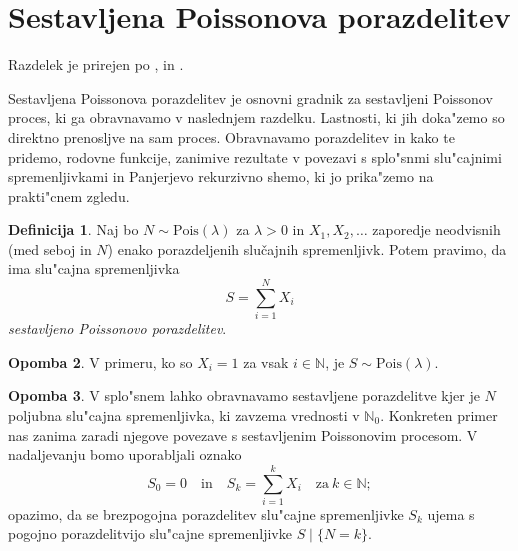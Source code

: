 \documentclass[12pt, a4paper, reqno]{amsart}
\theoremstyle{definition}
\newtheorem{definicija}{Definicija}[section]
\newtheorem{opomba}[definicija]{Opomba}
\theoremstyle{plain}
\newcommand{\N}{\mathbb{N}}
\newcommand{\1}{\mathds{1}}
\newcommand{\Pois}[1]{\text{Pois}(#1)}
\begin{document}
\section{Sestavljena Poissonova porazdelitev}

    \noindent
    Razdelek je prirejen po \cite{1}, \cite{2} in \cite{4}.

    Sestavljena Poissonova porazdelitev je osnovni gradnik za sestavljeni Poissonov proces, ki ga obravnavamo 
    v naslednjem razdelku. Lastnosti, ki jih doka"zemo so direktno prenosljve na sam proces. Obravnavamo 
    porazdelitev in kako te pridemo, rodovne funkcije, zanimive rezultate v povezavi s 
    splo"snmi slu"cajnimi spremenljivkami in Panjerjevo rekurzivno shemo, ki jo prika"zemo na 
    prakti"cnem zgledu.

    \begin{definicija}
        Naj bo $N\sim \Pois{\lambda}$  za $\lambda >0$ in $X_1, X_2, \dots$ zaporedje neodvisnih (med seboj in $N$)
        enako porazdeljenih slučajnih spremenljivk. Potem pravimo, da ima slu"cajna spremenljivka
        \begin{equation*}
            S = \sum_{i=1}^NX_i
        \end{equation*}
        \textit{sestavljeno Poissonovo porazdelitev}. 
        \label{def:sestavljenaPoissonovaPorazdelitev}
    \end{definicija}

    \begin{opomba}
        V primeru, ko so $X_i = 1$ za vsak $i\in\N$, je $S\sim\Pois{\lambda}$.
    \end{opomba}

    \begin{opomba}
        V splo"snem lahko obravnavamo sestavljene porazdelitve kjer je $N$ poljubna slu"cajna spremenljivka,
        ki zavzema vrednosti v $\N_0$. Konkreten primer nas zanima zaradi njegove povezave s sestavljenim
        Poissonovim procesom. V nadaljevanju bomo uporabljali oznako
        \begin{equation*}
            S_0 = 0 \quad \text{in} \quad S_k = \sum_{i=1}^kX_i \quad \text{za} \ k\in\N; 
        \end{equation*}
        opazimo, da se brezpogojna porazdelitev slu"cajne spremenljivke $S_k$ ujema s pogojno porazdelitvijo 
        slu"cajne spremenljivke $S\mid\{N = k\}$.
        \label{op:gneralCaseCOmpound}
    \end{opomba}
\end{document}
